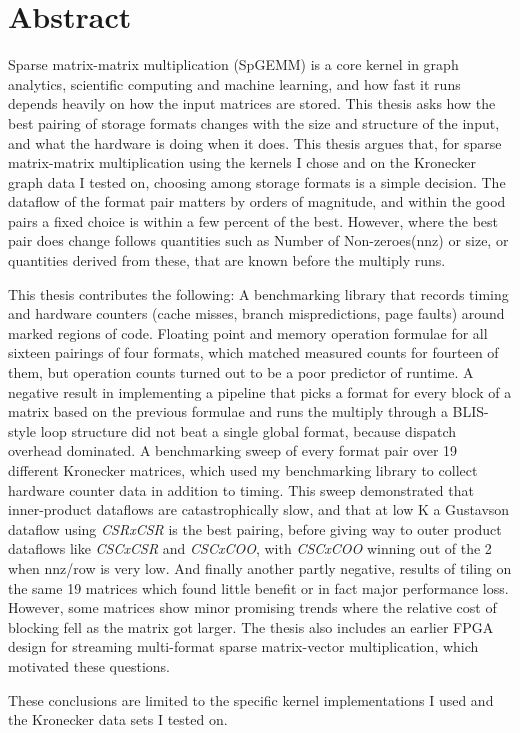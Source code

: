 \cleardoublepage
{}\chapter*{Abstract}

Sparse matrix-matrix multiplication (SpGEMM) is a core kernel in graph analytics, scientific computing and machine learning, and how fast it runs depends heavily on how the input matrices are stored. This thesis asks how the best pairing of storage formats changes with the size and structure of the input, and what the hardware is doing when it does. This thesis argues that, for sparse matrix-matrix multiplication using the kernels I chose and on the Kronecker graph data I tested on, choosing among storage formats is a simple decision. The dataflow of the format pair matters by orders of magnitude, and within the good pairs a fixed choice is within a few percent of the best. However, where the best pair does change follows quantities such as Number of Non-zeroes(nnz) or size, or quantities derived from these, that are known before the multiply runs.

This thesis contributes the following: A benchmarking library that records timing and hardware counters (cache misses, branch mispredictions, page faults) around marked regions of code. Floating point and memory operation formulae for all sixteen pairings of four formats, which matched measured counts for fourteen of them, but operation counts turned out to be a poor predictor of runtime. A negative result in implementing a pipeline that picks a format for every block of a matrix based on the previous formulae and runs the multiply through a BLIS-style loop structure did not beat a single global format, because dispatch overhead dominated. A benchmarking sweep of every format pair over 19 different Kronecker matrices, which used my benchmarking library to collect hardware counter data in addition to timing. This sweep demonstrated that inner-product dataflows are catastrophically slow, and that at low K a Gustavson dataflow using \emph{CSRxCSR} is the best pairing, before giving way to outer product dataflows like \emph{CSCxCSR} and \emph{CSCxCOO}, with \emph{CSCxCOO} winning out of the 2 when nnz/row is very low. And finally another partly negative, results of tiling on the same 19 matrices which found little benefit or in fact major performance loss. However, some matrices show minor promising trends where the relative cost of blocking fell as the matrix got larger. The thesis also includes an earlier FPGA design for streaming multi-format sparse matrix-vector multiplication, which motivated these questions.

These conclusions are limited to the specific kernel implementations I used and the Kronecker data sets I tested on.
